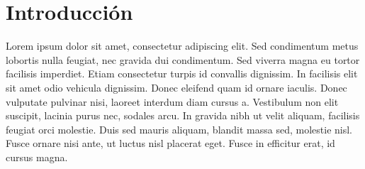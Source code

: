 \chapter{Introducción}
\doublespacing %

Lorem ipsum dolor sit amet, consectetur adipiscing elit. Sed condimentum metus lobortis nulla feugiat, nec gravida dui condimentum. Sed viverra magna eu tortor facilisis imperdiet. Etiam consectetur turpis id convallis dignissim. In facilisis elit sit amet odio vehicula dignissim. Donec eleifend quam id ornare iaculis. Donec vulputate pulvinar nisi, laoreet interdum diam cursus a. Vestibulum non elit suscipit, lacinia purus nec, sodales arcu. In gravida nibh ut velit aliquam, facilisis feugiat orci molestie. Duis sed mauris aliquam, blandit massa sed, molestie nisl. Fusce ornare nisi ante, ut luctus nisl placerat eget. Fusce in efficitur erat, id cursus magna.